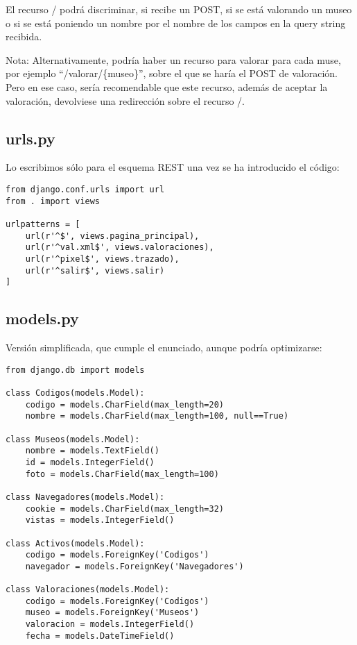 {El recurso / podrá discriminar, si recibe un POST, si se está valorando un museo o si se está poniendo un nombre por el nombre de los campos en la query string recibida.

\vspace{.3cm}

Nota: Alternativamente, podría haber un recurso para valorar para cada muse, por ejemplo ``/valorar/\{museo\}'', sobre el que se haría el POST de valoración. Pero en ese caso, sería recomendable que este recurso, además de aceptar la valoración, devolviese una redirección sobre el recurso /.

\subsection*{urls.py}

Lo escribimos sólo para el esquema REST una vez se ha introducido el código:

\begin{verbatim}
from django.conf.urls import url
from . import views

urlpatterns = [
    url(r'^$', views.pagina_principal),
    url(r'^val.xml$', views.valoraciones),
    url(r'^pixel$', views.trazado),
    url(r'^salir$', views.salir)
]
\end{verbatim}

\subsection*{models.py}

Versión simplificada, que cumple el enunciado, aunque podría optimizarse:

\begin{verbatim}
from django.db import models

class Codigos(models.Model):
    codigo = models.CharField(max_length=20)
    nombre = models.CharField(max_length=100, null==True)

class Museos(models.Model):
    nombre = models.TextField()
    id = models.IntegerField()
    foto = models.CharField(max_length=100)

class Navegadores(models.Model):
    cookie = models.CharField(max_length=32)
    vistas = models.IntegerField()

class Activos(models.Model):
    codigo = models.ForeignKey('Codigos')
    navegador = models.ForeignKey('Navegadores')

class Valoraciones(models.Model):
    codigo = models.ForeignKey('Codigos')
    museo = models.ForeignKey('Museos')
    valoracion = models.IntegerField()
    fecha = models.DateTimeField()
\end{verbatim}

}
